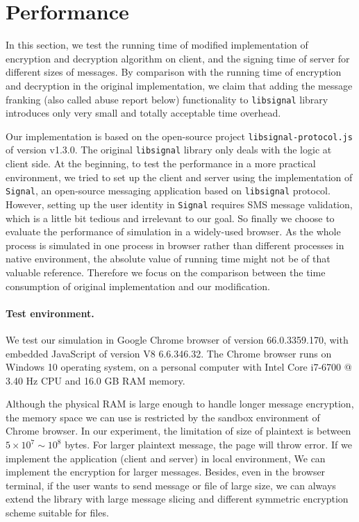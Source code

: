 
\section{Performance}
In this section, we test the running time of modified implementation of encryption and decryption algorithm on client,
and the signing time of server for different sizes of messages.
By comparison with the running time of encryption and decryption in the original implementation,
we claim that adding the message franking (also called abuse report below) functionality to \texttt{libsignal} library introduces only very small and totally acceptable time overhead. 


Our implementation is based on the open-source project \texttt{libsignal-protocol.js} of version v1.3.0.
The original \texttt{libsignal} library only deals with the logic at client side.
At the beginning, to test the performance in a more practical environment,
we tried to set up the client and server using the implementation of \texttt{Signal}, an open-source messaging application based on \texttt{libsignal} protocol.
However, setting up the user identity in \texttt{Signal} requires SMS message validation,
which is a little bit tedious and irrelevant to our goal.
So finally we choose to evaluate the performance of simulation in a widely-used browser.
As the whole process 
is simulated in one process in browser rather than different processes in native environment,
the absolute value of running time might not be of that valuable reference.
Therefore we focus on the comparison between the time consumption of original implementation and our modification.



\paragraph{Test environment.}
We test our simulation in Google Chrome browser of version 66.0.3359.170,
with embedded JavaScript of version V8 6.6.346.32.
The Chrome browser runs on Windows 10 operating system,
on a personal computer with Intel Core i7-6700 @ 3.40 Hz CPU and 16.0 GB RAM memory.


Although the physical RAM is large enough to handle longer message encryption,
the memory space we can use is restricted by the sandbox environment of Chrome browser.
In our experiment, the limitation of size of plaintext is between $5 \times 10^7 \sim 10^8$ bytes.
For larger plaintext message, the page will throw error.
If we implement the application (client and server) in local environment,
We can implement the encryption for larger messages.
Besides, even in the browser terminal,
if the user wants to send message or file of large size,
we can always extend the library with large message slicing and different symmetric encryption scheme suitable for files.

